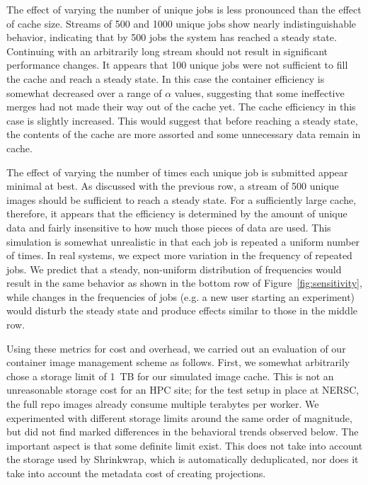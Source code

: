 \documentclass[sigconf]{acmart}
\begin{document}
The effect of varying the number of unique jobs is less pronounced than the effect of cache size.
Streams of 500 and 1000 unique jobs show nearly indistinguishable behavior,
indicating that by 500 jobs the system has reached a steady state.
Continuing with an arbitrarily long stream should not result in significant performance changes.
It appears that 100 unique jobs were not sufficient to fill the cache and reach a steady state.
In this case the container efficiency is somewhat decreased over a range of $\alpha$ values,
suggesting that some ineffective merges had not made their way out of the cache yet.
The cache efficiency in this case is slightly increased.
This would suggest that before reaching a steady state,
the contents of the cache are more assorted and some unnecessary data remain in cache.

The effect of varying the number of times each unique job is submitted appear minimal at best.
As discussed with the previous row,
a stream of 500 unique images should be sufficient to reach a steady state.
For a sufficiently large cache, therefore,
it appears that the efficiency is determined by the amount of unique data and fairly insensitive to how much those pieces of data are used.
This simulation is somewhat unrealistic in that each job is repeated a uniform number of times.
In real systems, we expect more variation in the frequency of repeated jobs.
We predict that a steady, non-uniform distribution of frequencies would result in the same behavior as shown in the bottom row of Figure~\ref{fig:sensitivity},
while changes in the frequencies of jobs (e.g. a new user starting an experiment)
would disturb the steady state and produce effects similar to those in the middle row.

Using these metrics for cost and overhead,
we carried out an evaluation of our container image management scheme as follows.
First, we somewhat arbitrarily chose a storage limit of 1~TB for our simulated image cache.
This is not an unreasonable storage cost for an HPC site;
for the test setup in place at NERSC,
the full repo images already consume multiple terabytes per worker.
We experimented with different storage limits around the same order of magnitude,
but did not find marked differences in the behavioral trends observed below.
The important aspect is that some definite limit exist.
This does not take into account the storage used by Shrinkwrap,
which is automatically deduplicated,
nor does it take into account the metadata cost of creating projections.
\end{document}
